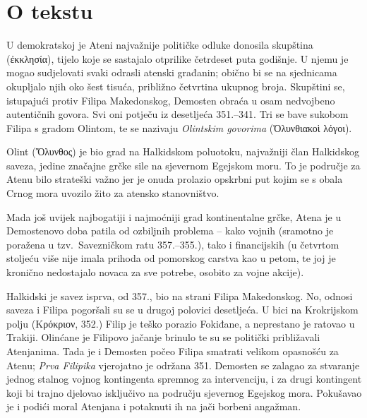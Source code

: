 


\section*{O tekstu}

U demokratskoj je Ateni najvažnije političke odluke donosila skupština \textgreek[variant=ancient]{(ἐκκλησία),} tijelo koje se sastajalo otprilike četrdeset puta godišnje. U njemu je mogao sudjelovati svaki odrasli atenski građanin; obično bi se na sjednicama okupljalo njih oko šest tisuća, približno četvrtina ukupnog broja. Skupštini se, istupajući protiv Filipa Makedonskog, Demosten obraća u osam nedvojbeno autentičnih govora. Svi oni potječu iz desetljeća 351.–341. Tri se bave sukobom Filipa s gradom Olintom, te se nazivaju \textit{Olintskim govorima} \textgreek[variant=ancient]{(Ὀλυνθιακοὶ λόγοι).}

Olint \textgreek[variant=ancient]{(Ὄλυνθος)} je bio grad na Halkidskom poluotoku, najvažniji član Halkidskog saveza, jedine značajne grčke sile na sjevernom Egejskom moru. To je područje za Atenu bilo strateški važno jer je onuda prolazio opskrbni put kojim se s obala Crnog mora uvozilo žito za atensko stanovništvo. 

Mada još uvijek najbogatiji i najmoćniji grad kontinentalne grčke, Atena je u Demostenovo doba patila od ozbiljnih problema – kako vojnih (sramotno je poražena u tzv.\ Savezničkom ratu 357.–355.), tako i financijskih (u četvrtom stoljeću više nije imala prihoda od pomorskog carstva kao u petom, te joj je kronično nedostajalo novaca za sve potrebe, osobito za vojne akcije).

Halkidski je savez isprva, od 357., bio na strani Filipa Makedonskog. No, odnosi saveza i Filipa pogoršali su se u drugoj polovici desetljeća. U bici na Krokrijskom polju \textgreek[variant=ancient]{(Κρόκριον,} 352.) Filip je teško porazio Fokiđane, a neprestano je ratovao u Trakiji. Olinćane je Filipovo jačanje brinulo te su se politički približavali Atenjanima. Tada je i Demosten počeo Filipa smatrati velikom opasnošću za Atenu; \textit{Prva Filipika} vjerojatno je održana 351. Demosten se zalagao za stvaranje jednog stalnog vojnog kontingenta spremnog za intervenciju, i za drugi kontingent koji bi trajno djelovao isključivo na području sjevernog Egejskog mora. Pokušavao je i podići moral Atenjana i potaknuti ih na jači borbeni angažman.

